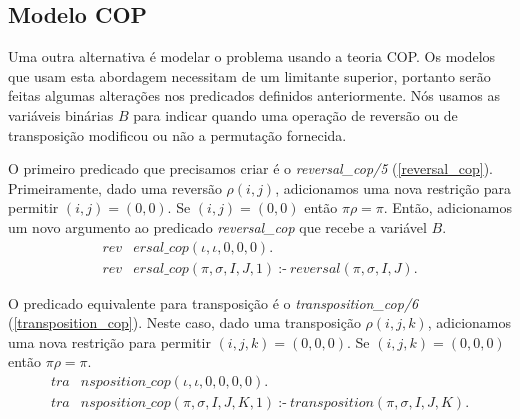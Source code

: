 \subsection{Modelo COP}
\label{subsec:modelcop}
Uma outra alternativa é modelar o problema usando a teoria COP. Os
modelos que usam esta abordagem necessitam de um limitante superior,
portanto serão feitas algumas alterações nos predicados definidos
anteriormente. Nós usamos as variáveis binárias $B$ para indicar
quando uma operação de reversão ou de transposição modificou ou não a
permutação fornecida.

O primeiro predicado que precisamos criar é o \textit{reversal\_cop/5}
(\ref{reversal_cop}). Primeiramente, dado uma reversão $\rho(i, j)$,
adicionamos uma nova restrição para permitir $(i, j) = (0, 0)$. Se
$(i, j) = (0, 0)$ então $\pi\rho = \pi$. Então, adicionamos um novo
argumento ao predicado \textit{reversal\_cop} que recebe a variável
$B$.
\begin{align}
  \label{reversal_cop}
  \textit{rev}&\textit{ersal\_cop}(\iota, \iota, 0, 0, 0). \\
  \textit{rev}&\textit{ersal\_cop}(\pi, \sigma, I, J, 1)~\text{:-}~ 
  \textit{reversal}(\pi, \sigma, I, J). \nonumber
\end{align}

O predicado equivalente para transposição é
o \textit{transposition\_cop/6} (\ref{transposition_cop}). Neste caso,
dado uma transposição $\rho(i, j, k)$, adicionamos uma nova restrição
para permitir $(i, j, k) = (0, 0, 0)$. Se $(i, j, k) = (0, 0, 0)$
então $\pi\rho = \pi$.
\begin{align}
  \label{transposition_cop}
  \textit{tra}&\textit{nsposition\_cop}(\iota, \iota, 0, 0, 0, 0). \\
  \textit{tra}&\textit{nsposition\_cop}(\pi, \sigma, I, J, K, 1)~\text{:-}~ 
  \textit{transposition}(\pi, \sigma, I, J, K). \nonumber
\end{align}

